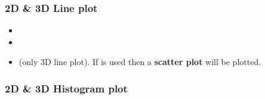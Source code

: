 \subsubsection{2D \& 3D Line plot}
  \begin{itemize}
    \item {}
    \item {}
    \item {} (only 3D line plot).
    \nb If  is used then a \textbf{scatter plot} will be plotted.
  \end{itemize}

\subsubsection{2D \& 3D Histogram plot}
